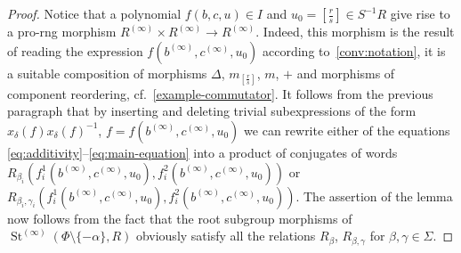 \documentclass[oneside, 11pt]{amsart}
\numberwithin{equation}{section}
\theoremstyle{definition}
\theoremstyle{remark}
\DeclareMathOperator\St{St}
\begin{document}
\begin{proof}
 Notice that a polynomial $f(b,c,u)\in I$ and $u_0 = [\tfrac r s] \in S^{-1}R$ give rise to a pro-rng morphism $R^{(\infty)}\times R^{(\infty)} \to R^{(\infty)}$.
 Indeed, this morphism is the result of reading the expression $f(b^{(\infty)}, c^{(\infty)}, u_0)$ according to~\cref{conv:notation}, it is a suitable composition of morphisms $\Delta$, $m_{[\tfrac r s]}$, $m$, $+$ and morphisms of component reordering, cf.~\cref{example-commutator}. It follows from the previous paragraph that by inserting and deleting trivial subexpressions of the form $x_{\delta}(f)x_{\delta}(f)^{-1}$, $f = f(b^{(\infty)}, c^{(\infty)}, u_0)$ we can rewrite either of the equations \eqref{eq:additivity}--\eqref{eq:main-equation} into a product of conjugates of words $R_{\beta_i}(f_{i}^1(b^{(\infty)},c^{(\infty)},u_0), f_{i}^2(b^{(\infty)},c^{(\infty)},u_0))$ or $R_{\beta_i,\gamma_i}(f^{1}_i(b^{(\infty)},c^{(\infty)},u_0), f^{2}_i(b^{(\infty)},c^{(\infty)},u_0))$.
 The assertion of the lemma now follows from the fact that the root subgroup morphisms of $\St^{(\infty)}(\Phi\setminus\{-\alpha\}, R)$ obviously satisfy all the relations $R_\beta$, $R_{\beta, \gamma}$ for $\beta,\gamma \in \Sigma$.
\end{proof}
\end{document}

